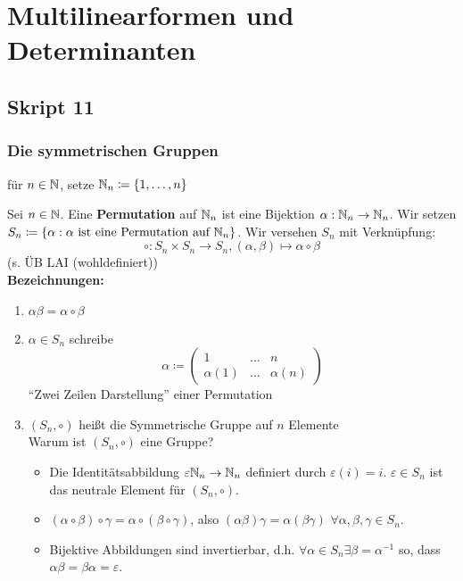 \section{Multilinearformen und Determinanten}
\setcounter{subsection}{10}
\subsection{Skript 11}
\setcounter{subenvironmentnumber}{-1}

\setcounter{subsubsection}{5}
\subsubsection{Die symmetrischen Gruppen }

\begin{subdefinition}[Notation]
	für $ n \in \mathbb{N}  $, setze $ \mathbb{N} _n \coloneqq \left\{ 1, \dotsc, n \right\}  $
\end{subdefinition}

\begin{subdefinition}
	Sei $ n \in \mathbb{N}  $. Eine \textbf{Permutation} auf $ \mathbb{N} _n $ ist eine Bijektion $ \alpha : \mathbb{N} _n \to \mathbb{N} _n $.
	Wir setzen $ S_n \coloneqq \left\{ \alpha : \alpha \text{ ist eine Permutation auf $ \mathbb{N} _n $}  \right\}  $.
	Wir versehen $ S_n $ mit Verknüpfung:
	\[
		\circ : S_n \times S_n \to S_n, (\alpha, \beta) \mapsto \alpha \circ \beta
	\]
	(s. ÜB LAI (wohldefiniert))\\
	\textbf{Bezeichnungen:}
	\begin{enumerate}[label=(\roman*)]
		\item $ \alpha \beta = \alpha \circ \beta $ 
		\item $ \alpha \in S_n $ schreibe
			\[
				\alpha \coloneqq \begin{pmatrix} 1 & \dotsc & n \\ \alpha(1) & \dotsc & \alpha(n) \end{pmatrix} 
			\]
			``Zwei Zeilen Darstellung'' einer Permutation
		\item $ (S_n, \circ) $ heißt die Symmetrische Gruppe auf $ n $ Elemente \\
			Warum ist $ (S_n, \circ) $ eine Gruppe?
			\begin{itemize}
				\item Die Identitätsabbildung $ \varepsilon \mathbb{N} _n \to \mathbb{N} _n  $ definiert durch $ \varepsilon (i) = i $.
					$ \varepsilon \in S_n $ ist das neutrale Element für $ (S_n, \circ) $.
				\item $ (\alpha \circ \beta) \circ \gamma = \alpha \circ (\beta \circ \gamma) $, also $ (\alpha \beta) \gamma = \alpha(\beta\gamma) $ $ \forall \alpha, \beta, \gamma \in S_n $.
				\item Bijektive Abbildungen sind invertierbar, d.h.
					$ \forall  \alpha \in S_n \exists \beta = \alpha ^{-1}  $ so, dass $ \alpha\beta = \beta\alpha = \varepsilon  $.
			\end{itemize}
	\end{enumerate}
\end{subdefinition}

